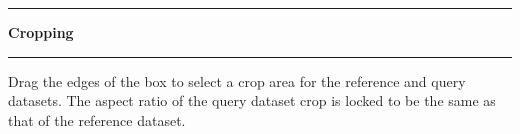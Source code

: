 \noindent\rule{\textwidth}{1pt}
\indent \textbf{Cropping}
\noindent\rule{\textwidth}{1pt}
\smallskip
\parbox{\textwidth}{Drag the edges of the box to select a crop area for the reference and query datasets. The aspect ratio of the query dataset crop is locked to be the same as that of the reference dataset.}
\smallskip
